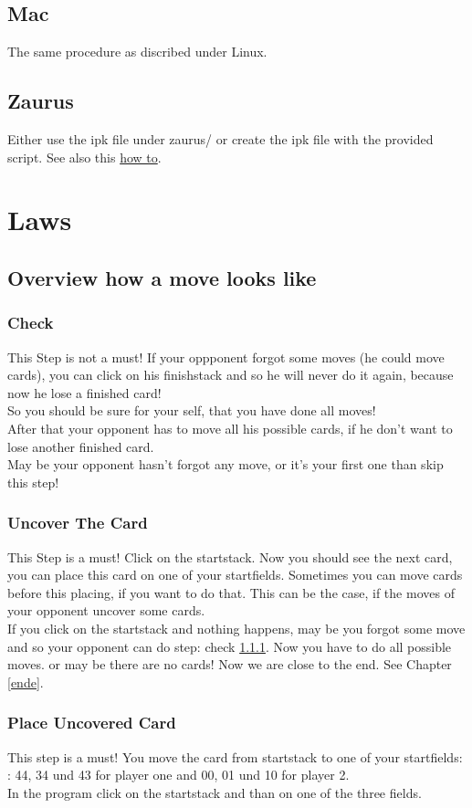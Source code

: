 \documentclass[12pt]{article}
\begin{document}
\subsection{Mac}
The same procedure as discribed under Linux.
\subsection{Zaurus}
Either use the ipk file under zaurus/ or create the ipk file with the provided script.
See also this
\href{http://www.oesf.org/index.php?title=IPKG_Howto}{how to}.
\section{Laws}
\subsection{Overview how a move looks like}
\subsubsection{Check}
\label{ueberpruefen}
This Step is not a must!
If your oppponent forgot some moves (he could move cards), you can click on his finishstack and so 
he will never do it again, because now he lose a finished card!\\
So you should be sure for your self, that you have done all moves!\\
After that your opponent has to move all his possible cards, if he don't want to lose another finished card.\\
May be your opponent hasn't forgot any move, or it's your first one than skip this step!
\subsubsection{Uncover The Card}
This Step is a must!
Click on the startstack. Now you should see the next card, you can place this card on one of your
startfields.
Sometimes you can move cards before this placing, if you want to do that. This can be the case, if the 
moves of your opponent uncover some cards.\\
If you click on the startstack and nothing happens, may be you forgot some move and so your opponent
can do step: check \ref{ueberpruefen}. Now you have to do all possible moves.
or may be there are no cards! Now we are close to the end. See Chapter \ref{ende}.
\subsubsection{Place Uncovered Card}
This step is a must!
You move the card from startstack to one of your startfields: : 44, 34 und 43 for player one and 
00, 01 und 10 for player 2.\\
In the program click on the startstack and than on one of the three fields.
\end{document}
